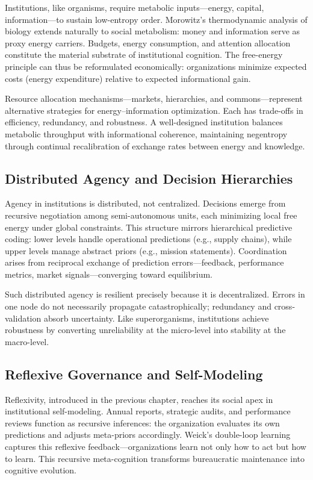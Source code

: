 \documentclass[11pt,a4paper]{article}
\begin{document}
Institutions, like organisms, require metabolic inputs—energy, capital, information—to sustain low-entropy order.  Morowitz’s thermodynamic analysis of biology \citep{Morowitz1968EnergyFlowBiology} extends naturally to social metabolism: money and information serve as proxy energy carriers.  Budgets, energy consumption, and attention allocation constitute the material substrate of institutional cognition.  The free-energy principle can thus be reformulated economically: organizations minimize expected costs (energy expenditure) relative to expected informational gain.

Resource allocation mechanisms—markets, hierarchies, and commons—represent alternative strategies for energy–information optimization.  Each has trade-offs in efficiency, redundancy, and robustness.  A well-designed institution balances metabolic throughput with informational coherence, maintaining negentropy through continual recalibration of exchange rates between energy and knowledge.

\subsection{Distributed Agency and Decision Hierarchies}

Agency in institutions is distributed, not centralized.  Decisions emerge from recursive negotiation among semi-autonomous units, each minimizing local free energy under global constraints.  This structure mirrors hierarchical predictive coding: lower levels handle operational predictions (e.g., supply chains), while upper levels manage abstract priors (e.g., mission statements).  Coordination arises from reciprocal exchange of prediction errors—feedback, performance metrics, market signals—converging toward equilibrium.

Such distributed agency is resilient precisely because it is decentralized.  Errors in one node do not necessarily propagate catastrophically; redundancy and cross-validation absorb uncertainty.  Like superorganisms, institutions achieve robustness by converting unreliability at the micro-level into stability at the macro-level.

\subsection{Reflexive Governance and Self-Modeling}

Reflexivity, introduced in the previous chapter, reaches its social apex in institutional self-modeling.  Annual reports, strategic audits, and performance reviews function as recursive inferences: the organization evaluates its own predictions and adjusts meta-priors accordingly.  Weick’s double-loop learning \citep{Weick1979SocialPsychOrganization} captures this reflexive feedback—organizations learn not only how to act but how to learn.  This recursive meta-cognition transforms bureaucratic maintenance into cognitive evolution.
\end{document}
